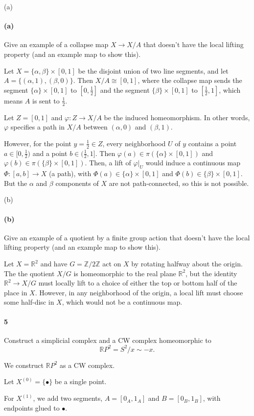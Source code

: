 \documentclass[12pt]{article}
\newlength{\myparskip}
\newenvironment{fullbox}{\begin{lrbox}{\savefullbox}\begin{minipage}{\dimexpr\textwidth-2\fboxsep\relax}\setlength{\parskip}{\myparskip}}{\end{minipage}\end{lrbox}\framebox[\textwidth]{\usebox{\savefullbox}}}
\newenvironment{pbox}[1][]{\begin{fullbox}\ifx#1\empty\else\paragraph{#1}\fi}{\end{fullbox}}
\newcommand{\Z}{\mathbb{Z}}
\newcommand{\R}{\mathbb{R}}
\renewcommand{\phi}{\varphi}
\newcommand{\<}{\langle}
\renewcommand{\>}{\rangle}
\newcommand{\isom}{\cong}
\theoremstyle{definition}
\begin{document}
\begin{pbox}[(a)]
    Give an example of a collapse map $X \to X/A$ that doesn't have the local lifting property (and an example map to show this).
\end{pbox}

Let $X = \{\alpha, \beta\} \times [0, 1]$ be the disjoint union of two line segments, and let $A = \{(\alpha, 1), (\beta, 0)\}$. Then $X/A \isom [0, 1]$, where the collapse map sends the segment $\{\alpha\} \times [0, 1]$ to $[0, \frac{1}{2}]$ and the segment $\{\beta\} \times [0, 1]$ to $[\frac{1}{2}, 1]$, which means $A$ is sent to $\frac{1}{2}$.

Let $Z = [0, 1]$ and $\phi : Z \to X/A$ be the induced homeomorphism. In other words, $\phi$ specifies a path in $X/A$ between $(\alpha, 0)$ and $(\beta, 1)$.

However, for the point $y = \frac{1}{2} \in Z$, every neighborhood $U$ of $y$ contains a point $a \in [0, \frac{1}{2})$ and a point $b \in (\frac{1}{2}, 1]$. Then $\phi(a) \in \pi(\{\alpha\} \times [0, 1])$ and $\phi(b) \in \pi(\{\beta\} \times [0, 1])$. Then, a lift of $\phi|_U$ would induce a continuous map $\Phi : [a, b] \to X$ (a path), with $\Phi(a) \in \{\alpha\} \times [0, 1]$ and $\Phi(b) \in \{\beta\} \times [0, 1]$. But the $\alpha$ and $\beta$ components of $X$ are not path-connected, so this is not possible.

\begin{pbox}[(b)]
    Give an example of a quotient by a finite group action that doesn't have the local lifting property (and an example map to show this).
\end{pbox}

Let $X = \R^2$ and have $G = \Z/2\Z$ act on $X$ by rotating halfway about the origin. The the quotient $X/G$ is homeomorphic to the real plane $\R^2$, but the identity $\R^2 \to X/G$ must locally lift to a choice of either the top or bottom half of the place in $X$. However, in any neighborhood of the origin, a local lift must choose some half-disc in $X$, which would not be a continuous map.


\newpage
\begin{pbox}[5]
    Construct a simplicial complex and a CW complex homeomorphic to
  \[\mathbb RP^2=S^2/x \sim -x.\]
\end{pbox}

We construct $\R P^2$ as a CW  complex.

Let $X^{(0)} = \{\bullet\}$ be a single point.

For $X^{(1)}$, we add two segments, $A = [0_A, 1_A]$ and $B = [0_B, 1_B]$, with endpoints glued to $\bullet$.
\end{document}
